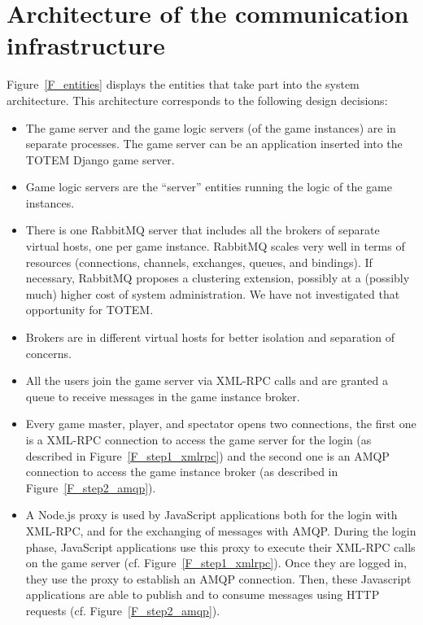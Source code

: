 
\section{Architecture of the communication infrastructure}
\label{S_architecture}

Figure~\ref{F_entities} displays the entities that take part into the
system architecture. This architecture corresponds to the following
design decisions:
\begin{itemize}
\item The game server and the game logic servers (of the game
  instances) are in separate processes. The game server can be
  an application inserted into the TOTEM \textsf{Django} game server.
\item Game logic servers are the ``server'' entities running the logic
  of the game instances.
\item There is one \textsf{RabbitMQ} server that includes all the
  brokers of separate virtual hosts, one per game instance. 
  \textsf{RabbitMQ} scales very well in terms of resources
  (connections, channels, exchanges, queues, and bindings). If
  necessary, \textsf{RabbitMQ} proposes a clustering extension,
  possibly at a (possibly much) higher cost of system
  administration. We have not investigated that opportunity for TOTEM.
\item Brokers are in different virtual hosts for better isolation and
  separation of concerns.
\item All the users join the game server via XML-RPC calls and are
  granted a queue to receive messages in the game instance broker.
\item Every game master, player, and spectator opens two connections,
  the first one is a XML-RPC connection to access the game server for the
  login (as described in Figure~\ref{F_step1_xmlrpc}) and the second one 
  is an AMQP connection to access the game instance broker (as described in
  Figure~\ref{F_step2_amqp}).
\item A \textsf{Node.js} proxy is used by JavaScript applications both for 
  the login with XML-RPC, and for the exchanging of messages with AMQP.
  During the login phase, JavaScript applications use this proxy to execute
  their XML-RPC calls on the game server (cf. Figure~\ref{F_step1_xmlrpc}). 
  Once they are logged in, they use the proxy to establish an AMQP connection. 
  Then, these Javascript applications are able to publish and to consume 
  messages using HTTP requests (cf. Figure~\ref{F_step2_amqp}).

\end{itemize}

